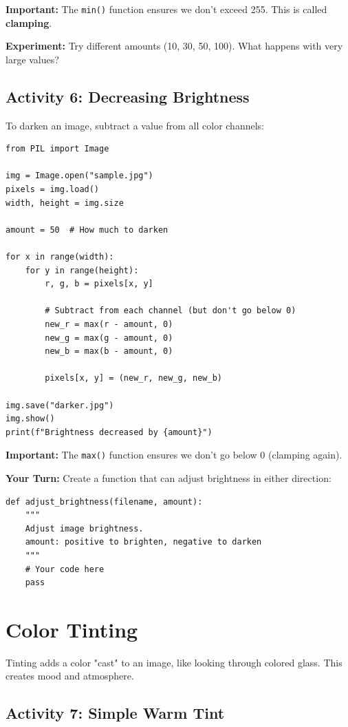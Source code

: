 \documentclass[11pt]{article}
\begin{document}
\textbf{Important:} The \texttt{min()} function ensures we don't exceed 255. This is called \textbf{clamping}.

\textbf{Experiment:} Try different amounts (10, 30, 50, 100). What happens with very large values?

\subsection*{Activity 6: Decreasing Brightness}

To darken an image, subtract a value from all color channels:

\begin{lstlisting}
from PIL import Image

img = Image.open("sample.jpg")
pixels = img.load()
width, height = img.size

amount = 50  # How much to darken

for x in range(width):
    for y in range(height):
        r, g, b = pixels[x, y]

        # Subtract from each channel (but don't go below 0)
        new_r = max(r - amount, 0)
        new_g = max(g - amount, 0)
        new_b = max(b - amount, 0)

        pixels[x, y] = (new_r, new_g, new_b)

img.save("darker.jpg")
img.show()
print(f"Brightness decreased by {amount}")
\end{lstlisting}

\textbf{Important:} The \texttt{max()} function ensures we don't go below 0 (clamping again).

\textbf{Your Turn:} Create a function that can adjust brightness in either direction:

\begin{lstlisting}
def adjust_brightness(filename, amount):
    """
    Adjust image brightness.
    amount: positive to brighten, negative to darken
    """
    # Your code here
    pass
\end{lstlisting}

\section{Color Tinting}

Tinting adds a color "cast" to an image, like looking through colored glass. This creates mood and atmosphere.

\subsection*{Activity 7: Simple Warm Tint}
\end{document}

